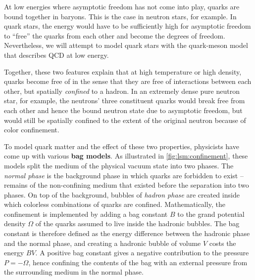 
At low energies where asymptotic freedom has not come into play, quarks are bound together in baryons.
This is the case in neutron stars, for example.
In quark stars, the energy would have to be sufficiently high for asymptotic freedom to ``free'' the quarks from each other and become the degrees of freedom.
Nevertheless, we will attempt to model quark stars with the quark-meson model that describes QCD at low energy.

Together, these two features explain that at high temperature or high density, quarks become free of  in the sense that they are free of interactions between each other,
but spatially \emph{confined} to a hadron.
In an extremely dense pure neutron star, for example,
the neutrons' three constituent quarks would break free from each other and hence the bound neutron state due to asymptotic freedom,
but would still be spatially confined to the extent of the original neutron because of color confinement.

To model quark matter and the effect of these two properties,
physicists have come up with various \textbf{bag models}.
As illustrated in \cref{fig:lsm:confinement}, these models split the medium of the physical vacuum state into two phases.
The \emph{normal phase} is the background phase in which quarks are forbidden to exist -- remains of the non-confining medium that existed before the separation into two phases.
On top of the background, bubbles of \emph{hadron phase} are created inside which colorless combinations of quarks are confined.
Mathematically, the confinement is implemented by adding a bag constant $B$ to the grand potential density $\Omega$ of the quarks assumed to live inside the hadronic bubbles.
The bag constant is therefore defined as the energy difference between the hadronic phase and the normal phase,
and creating a hadronic bubble of volume $V$ costs the energy $B V$.
A positive bag constant gives a negative contribution to the pressure $P = -\Omega$,
hence confining the contents of the bag with an external pressure from the surrounding medium in the normal phase.


